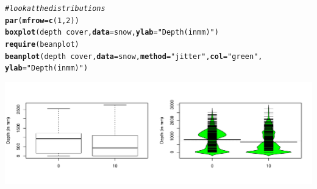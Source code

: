\documentclass[12pt]{article}\usepackage[]{graphicx}\usepackage[]{color}
\makeatletter
\newcommand{\hlnum}[1]{\textcolor[rgb]{0,0,0}{#1}}%
\newcommand{\hlstr}[1]{\textcolor[rgb]{0,0,0}{#1}}%
\newcommand{\hlcom}[1]{\textcolor[rgb]{0.4,0.4,0.4}{\textit{#1}}}%
\newcommand{\hlopt}[1]{\textcolor[rgb]{0,0,0}{\textbf{#1}}}%
\newcommand{\hlstd}[1]{\textcolor[rgb]{0,0,0}{#1}}%
\newcommand{\hlkwc}[1]{\textcolor[rgb]{0,0,0}{\textbf{#1}}}%
\newcommand{\hlkwd}[1]{\textcolor[rgb]{0,0,0}{\textbf{#1}}}%
\newenvironment{kframe}{%
 \def\at@end@of@kframe{}%
 \ifinner\ifhmode%
  \def\at@end@of@kframe{\end{minipage}}%
  \begin{minipage}{\columnwidth}%
 \fi\fi%
 \def\FrameCommand##1{\hskip\@totalleftmargin \hskip-\fboxsep
 \colorbox{shadecolor}{##1}\hskip-\fboxsep
     \hskip-\linewidth \hskip-\@totalleftmargin \hskip\columnwidth}%
 \MakeFramed {\advance\hsize-\width
   \@totalleftmargin\z@ \linewidth\hsize
   \@setminipage}}%
 {\par\unskip\endMakeFramed%
 \at@end@of@kframe}
\newenvironment{knitrout}{}{} %
\renewenvironment{knitrout}{\begin{footnotesize}}{\end{footnotesize}}
\makeatother
\begin{document}
\begin{knitrout}\footnotesize
{}\color{fgcolor}\begin{kframe}
\begin{alltt}
\hlcom{# look at the distributions}
\hlkwd{par}\hlstd{(}\hlkwc{mfrow} \hlstd{=} \hlkwd{c}\hlstd{(}\hlnum{1}\hlstd{,} \hlnum{2}\hlstd{))}
\hlkwd{boxplot}\hlstd{(depth} \hlopt{~} \hlstd{cover,} \hlkwc{data} \hlstd{= snow,} \hlkwc{ylab} \hlstd{=} \hlstr{"Depth (in mm)"}\hlstd{)}
\hlkwd{require}\hlstd{(beanplot)}
\hlkwd{beanplot}\hlstd{(depth} \hlopt{~} \hlstd{cover,} \hlkwc{data} \hlstd{= snow,} \hlkwc{method} \hlstd{=} \hlstr{"jitter"}\hlstd{,} \hlkwc{col} \hlstd{=} \hlstr{"green"}\hlstd{,}
    \hlkwc{ylab} \hlstd{=} \hlstr{"Depth (in mm)"}\hlstd{)}
\end{alltt}
\end{kframe}

{\centering \includegraphics[width=\linewidth,height=0.3\linewidth]{figure/3-1} 

}



\end{knitrout}
\end{document}
